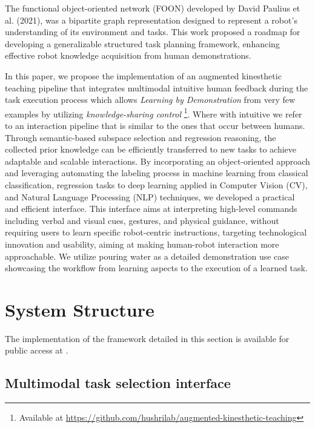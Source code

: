 \documentclass[conference]{IEEEtran}
\begin{document}
The functional object-oriented network (FOON) developed by David Paulius et al. (2021)\cite{Paulius2021}, was a bipartite graph representation designed to represent a robot's understanding of its environment and tasks. This work proposed a roadmap for developing a generalizable structured task planning framework, enhancing effective robot knowledge acquisition from human demonstrations. 

In this paper, we propose the implementation of an augmented kinesthetic teaching pipeline that integrates multimodal intuitive human feedback during the task execution process which allows \textit{Learning by Demonstration} from very few examples by utilizing \textit{knowledge-sharing control} \footnote{Available at \href{https://github.com/hushrilab/augmented-kinesthetic-teaching}{https://github.com/hushrilab/augmented-kinesthetic-teaching}}. Where with intuitive we refer to an interaction pipeline that is similar to the ones that occur between humans. Through semantic-based subspace selection and regression reasoning, the collected prior knowledge can be efficiently transferred to new tasks to achieve adaptable and scalable interactions. 
By incorporating an object-oriented approach and leveraging automating the labeling process in machine learning from classical classification, regression tasks to deep learning applied in Computer Vision (CV), and Natural Language Processing (NLP) techniques, we developed a practical and efficient interface. This interface aims at interpreting high-level commands including verbal and visual cues, gestures, and physical guidance, without requiring users to learn specific robot-centric instructions, targeting technological innovation and usability, aiming at making human-robot interaction more approachable. We utilize pouring water as a detailed demonstration use case showcasing the workflow from learning aspects to the execution of a learned task. 

\section{System Structure}

The implementation of the framework detailed in this section is available for public access at \cite{augmentedkinesthetic}. %

\subsection{Multimodal task selection interface}
\end{document}
